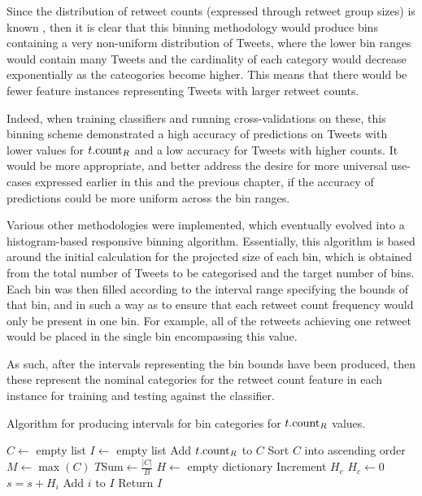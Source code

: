 Since the distribution of retweet counts (expressed through retweet group sizes) is known \cite{webberley11}, then it is clear that this binning methodology would produce bins containing a very non-uniform distribution of Tweets, where the lower bin ranges would contain many Tweets and the cardinality of each category would decrease exponentially as the cateogories become higher. This means that there would be fewer feature instances representing Tweets with larger retweet counts.

 Indeed, when training classifiers and running cross-validations on these, this binning scheme demonstrated a high accuracy of predictions on Tweets with lower values for $t.\textrm{count}_R$ and a low accuracy for Tweets with higher counts. It would be more appropriate, and better address the desire for more universal use-cases expressed earlier in this and the previous chapter, if the accuracy of predictions could be more uniform across the bin ranges.

Various other methodologies were implemented, which eventually evolved into a histogram-based responsive binning algorithm. Essentially, this algorithm is based around the initial calculation for the projected size of each bin, which is obtained from the total number of Tweets to be categorised and the target number of bins. Each bin was then filled according to the interval range specifying the bounds of that bin, and in such a way as to ensure that each retweet count frequency would only be present in one bin. For example, all of the retweets achieving one retweet would be placed in the single bin encompassing this value.

As such, after the intervals representing the bin bounds have been produced, then these represent the nominal categories for the retweet count feature in each instance for training and testing against the classifier.



\begin{algorithm}
\caption{Algorithm for producing intervals for bin categories for $t.\textrm{count}_R$ values.}
\begin{algorithmic}[1]
    \State $C\gets$ empty list 
    \State $I\gets$ empty list 
        \State Add $t.\textrm{count}_R$ to $C$
    \EndFor
    \State Sort $C$ into ascending order 
    \State $M\gets\max(C)$ 
    \State $T\textrm{Sum}\gets\frac{|C|}{B}$ 
    \State $H\gets$ empty dictionary 
    \Statex
            \State Increment $H_c$
        \Else
            \State $H_c\gets0$
        \EndIf
    \EndFor
            \State $s = s + H_i$
        \EndIf
            \State Add $i$ to $I$
        \EndIf
    \EndFor
    \State Return $I$
\EndProcedure
\end{algorithmic}
\label{algo2}
\end{algorithm}
 
